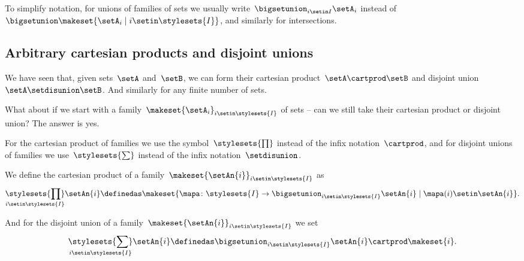 \begin{remark}
    To simplify notation, for unions of families of sets we usually write~$\bigsetunion_{i \setin I} \setA_i $ instead of~$\bigsetunion \makeset{  \setA_i \mid i \setin\stylesets{I} }$, and similarly for intersections.
\end{remark}

\subsection{Arbitrary cartesian products and disjoint unions}

We have seen that, given sets~$\setA$ and~$\setB$, we can form their cartesian product~$\setA \cartprod \setB$ and disjoint union~$\setA \setdisunion \setB$.
And similarly for any finite number of sets.

What about if we start with a family~$\makeset{ \setA_i }_{i \setin\stylesets{I}}$ of sets -- can we still take their cartesian product or disjoint union?
The answer is yes.

For the cartesian product of families we use the symbol~$\stylesets{\prod}$ instead of the infix notation~$\cartprod$, and for disjoint unions of families we use~$\stylesets{\sum}$ instead of the infix notation~$\setdisunion$.

We define the cartesian product of a family~$\makeset{ \setAn{i} }_{i \setin\stylesets{I}}$ as
\begin{equation}
    \underset{i \setin\stylesets{I}}{\stylesets{\prod}}  \setAn{i}  \definedas \makeset{ \mapa \colon \stylesets{I} \to \bigsetunion_{i \setin\stylesets{I} } \setAn{i} \mid \mapa(i) \setin\setAn{i} }.
\end{equation}

And for the disjoint union of a family~$\makeset{ \setAn{i} }_{i \setin\stylesets{I}}$ we set
\begin{equation}
    \underset{i \setin\stylesets{I}}{\stylesets{\sum}} \setAn{i} \definedas \bigsetunion_{i \setin\stylesets{I}} \setAn{i} \cartprod \makeset{ i }.
\end{equation}

